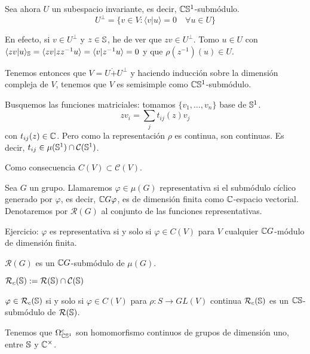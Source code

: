 Sea ahora \(U\) un subespacio invariante, es decir,
\(\mathbb{C} \mathbb{S}^1\)-submódulo.
\[
  U^\perp=\{v\in V:\langle v|u\rangle =0\quad\forall u\in U\}
\]

En efecto, si \(v\in U^\perp\) y \(z\in\mathbb{S}\), he de ver que
\(zv\in U^\perp\). Tomo \(u\in U\) con
\(\langle zv|u\rangle_{\mathbb{S}}=\langle zv|zz^{-1}u\rangle=
\langle v|z^{-1}u\rangle=0\) y que \(\rho(z^{-1})(u)\in U\).

Tenemos entonces que \(V=U\dot{+}U^\perp\) y haciendo inducción sobre la
dimensión compleja de \(V\), tenemos que \(V\) es semisimple como
\(\mathbb{C}\mathbb{S}^1\)-submódulo.

Busquemos las funciones matriciales: tomamos \(\{v_1,\ldots,v_n\}\) base
de \(\mathbb{S}^1\).
\[
  z v_i=\sum_{j} t_{ij}(z)v_j
\]
con \(t_{ij}(z)\in\mathbb{C}\). Pero como la representación \(\rho\)
es continua, son continuas. Es decir, \(t_{ij}\in\mu(\mathbb{S}^1)
\cap\mathcal{C}(\mathbb{S}^1)\).

Como consecuencia \(C(V)\subset\mathcal{C}(V)\).

\begin{df}
  Sea \(G\) un grupo. Llamaremos \(\varphi\in\mu(G)\) representativa si
  el submódulo cíclico generado por \(\varphi\), es decir,
  \(\mathbb{C} G\varphi\), es de dimensión finita como \(\mathbb{C}\)-espacio vectorial.
  Denotaremos por \(\mathcal{R}(G)\) al conjunto de las funciones
  representativas.
\end{df}

Ejercicio: \(\varphi\) es representativa si y solo si \(\varphi\in C(V)\)
para \(V\) cualquier \(\mathbb{C} G\)-módulo de dimensión finita.

\begin{prop}
  \(\mathcal{R}(G)\) es un \(\mathbb{C} G\)-submódulo de \(\mu(G)\).
\end{prop}

\begin{df}
  \(\mathcal{R}_c(\mathbb{S}):=\mathcal{R}(\mathbb{S})\cap\mathcal{C}(\mathbb{S})\)
\end{df}
\begin{prop}
  \(\varphi\in\mathcal{R}_c(\mathbb{S})\) si y solo si \(\varphi\in C(V)\)
  para \(\rho:S\longrightarrow GL(V)\) continua \(\mathcal{R}_c(\mathbb{S})\)
  es un \(\mathbb{C}\mathbb{S}\)-submódulo de \(\mathcal{R}(\mathbb{S})\).
\end{prop}

Tenemos que \(\Omega^c_{\mathbb{C}\mathbb{S}^1}\) son homomorfismo continuos de grupos de
dimensión uno, entre \(\mathbb{S}\) y \(\mathbb{C}^\times\).

